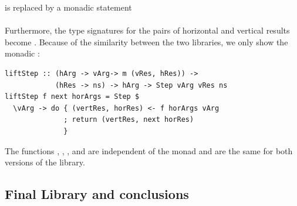 \documentclass{llncs}
\begin{document}
is replaced by a monadic statement\\

\noindent
{}\\

Furthermore, the type signatures for the pairs of horizontal and vertical results  become . Because of the similarity between the two libraries, we only show the monadic :

\begin{small}
\begin{verbatim}
liftStep :: (hArg -> vArg-> m (vRes, hRes)) -> 
            (hRes -> ns) -> hArg -> Step vArg vRes ns
liftStep f next horArgs = Step $ 
  \vArg -> do { (vertRes, horRes) <- f horArgs vArg
              ; return (vertRes, next horRes)
              }
\end{verbatim}
\end{small}%

The functions , , , and  are independent of the monad and are the same for both versions of the library.


%																
\subsection{Final Library and conclusions} \label{sect:libAndConclusions}
\end{document}
